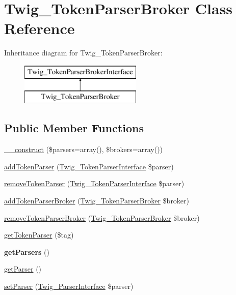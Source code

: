 \hypertarget{class_twig___token_parser_broker}{}\section{Twig\+\_\+\+Token\+Parser\+Broker Class Reference}
\label{class_twig___token_parser_broker}
Inheritance diagram for Twig\+\_\+\+Token\+Parser\+Broker\+:\begin{figure}[H]
\begin{center}
\leavevmode
\includegraphics[height=2.000000cm]{class_twig___token_parser_broker}
\end{center}
\end{figure}
\subsection*{Public Member Functions}
\begin{DoxyCompactItemize}
\item 
\hyperlink{class_twig___token_parser_broker_a5378f462d594396faab17d015277cb1d}{\+\_\+\+\_\+construct} (\$parsers=array(), \$brokers=array())
\item 
\hyperlink{class_twig___token_parser_broker_a8f805d29eac2b8ce1da513e9390952f3}{add\+Token\+Parser} (\hyperlink{interface_twig___token_parser_interface}{Twig\+\_\+\+Token\+Parser\+Interface} \$parser)
\item 
\hyperlink{class_twig___token_parser_broker_aa4402c2e54d4c1a7b89b175084465045}{remove\+Token\+Parser} (\hyperlink{interface_twig___token_parser_interface}{Twig\+\_\+\+Token\+Parser\+Interface} \$parser)
\item 
\hyperlink{class_twig___token_parser_broker_a4d48ade56aed5a989f6fe4cf7e40017b}{add\+Token\+Parser\+Broker} (\hyperlink{class_twig___token_parser_broker}{Twig\+\_\+\+Token\+Parser\+Broker} \$broker)
\item 
\hyperlink{class_twig___token_parser_broker_a8089187f9f7ad48dac1e6ebe7efdb8ba}{remove\+Token\+Parser\+Broker} (\hyperlink{class_twig___token_parser_broker}{Twig\+\_\+\+Token\+Parser\+Broker} \$broker)
\item 
\hyperlink{class_twig___token_parser_broker_adff2d8a3b28dce12e0bccd335af4012f}{get\+Token\+Parser} (\$tag)
\item 
\hypertarget{class_twig___token_parser_broker_a79cfaa4562ab2e470afc52c22acd1917}{}{\bfseries get\+Parsers} ()\label{class_twig___token_parser_broker_a79cfaa4562ab2e470afc52c22acd1917}

\item 
\hyperlink{class_twig___token_parser_broker_a4b6907ea868dc9053e1f7d6260fa4b4f}{get\+Parser} ()
\item 
\hyperlink{class_twig___token_parser_broker_ac16cd9a5f9db326226c01aa3ee943857}{set\+Parser} (\hyperlink{interface_twig___parser_interface}{Twig\+\_\+\+Parser\+Interface} \$parser)
\end{DoxyCompactItemize}

